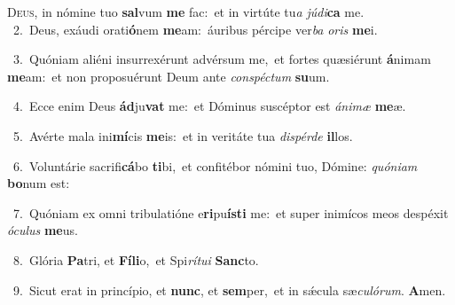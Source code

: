 \lettrine{\initial\textcolor{\initialcolor}{D}}{eus,} in nómine tuo \textbf{sal}\-vum \textbf{me} fac:~\star et in virtúte tu\textit{a} \textit{jú}\-\textit{di}\textbf{ca} me.\\
{\numbfont\textcolor{\numbcolor}{~2.}}~Deus, exáudi orati\-\textbf{ó}\-nem \textbf{me}\-am:~\star áuribus pércipe ver\textit{ba} \textit{o}\-\textit{ris} \textbf{me}\-i.\par
{\numbfont\textcolor{\numbcolor}{~3.}}~Quóniam aliéni insurrexérunt advérsum me,~\dagger et fortes quæsiérunt \textbf{á}\-nimam \textbf{me}\-am:~\star et non proposuérunt Deum ante \textit{con}\-\textit{spéc}\textit{tum} \textbf{su}\-um.\par
{\numbfont\textcolor{\numbcolor}{~4.}}~Ecce enim Deus \textbf{ád}\-ju\textbf{vat} me:~\star et Dóminus suscéptor est \textit{á}\-\textit{ni}\textit{mæ} \textbf{me}\-æ.\par
{\numbfont\textcolor{\numbcolor}{~5.}}~Avérte mala ini\-\textbf{mí}\-cis \textbf{me}\-is:~\star et in veritáte tua \textit{dis}\-\textit{pér}\textit{de} \textbf{il}\-los.\par
{\numbfont\textcolor{\numbcolor}{~6.}}~Voluntárie sacrifi\-\textbf{cá}\-bo \textbf{ti}\-bi,~\star et confitébor nómini tuo, Dómine: \textit{quón}\-\textit{i}\textit{am} \textbf{bo}\-num est:\par
{\numbfont\textcolor{\numbcolor}{~7.}}~Quóniam ex omni tribulatióne e\-\textbf{ri}\-pu\-\textbf{ís}\-\textbf{ti} me:~\star et super inimícos meos despéxit \textit{ó}\-\textit{cu}\textit{lus} \textbf{me}\-us.\par
{\numbfont\textcolor{\numbcolor}{~8.}}~Glória \textbf{Pa}\-tri, et \textbf{Fí}\-\textbf{li}o,~\star et Spi\-\textit{rí}\-\textit{tu}\textit{i} \textbf{Sanc}\-to.\par
{\numbfont\textcolor{\numbcolor}{~9.}}~Sicut erat in princípio, et \textbf{nunc}\-, et \textbf{sem}\-per,~\star et in sǽcula sæ\-\textit{cu}\-\textit{ló}\textit{rum}. \textbf{A}\-men.\par

